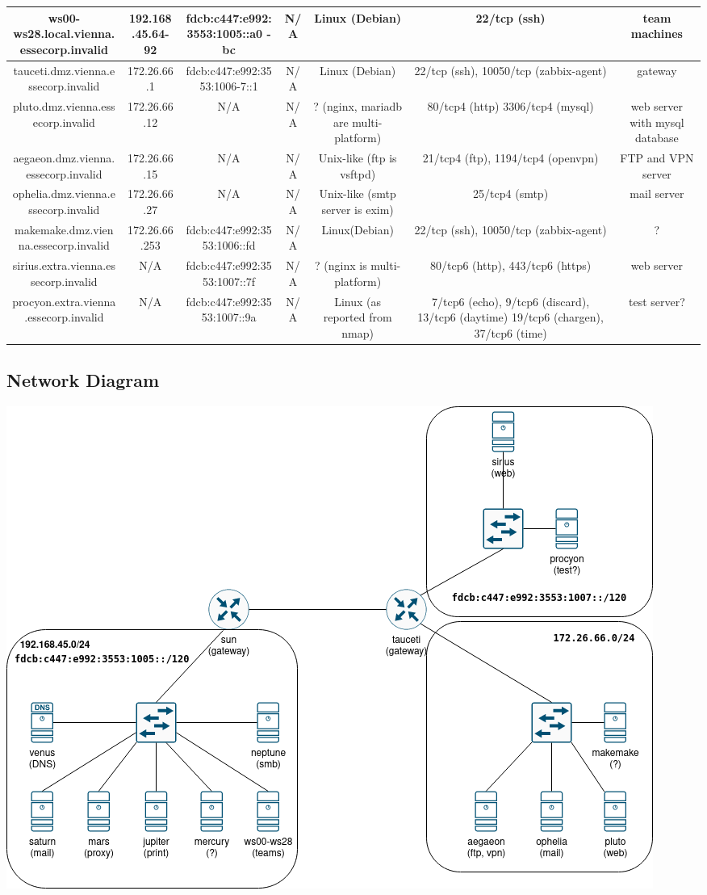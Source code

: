 \begin{center}
{\begin{tabular}{| c | c | c | c | c | c | c |}
        \hline
        ws00-ws28.local.vienna.essecorp.invalid & 192.168.45.64-92 & fdcb:c447:e992:3553:1005::a0 - bc & N/A & Linux (Debian) & 22/tcp (ssh) & team machines \\
        \hline
        tauceti.dmz.vienna.essecorp.invalid     & 172.26.66.1    & fdcb:c447:e992:3553:1006-7::1 & N/A & Linux (Debian) & 22/tcp (ssh), 10050/tcp (zabbix-agent) & gateway \\
        \hline
        pluto.dmz.vienna.essecorp.invalid       & 172.26.66.12   & N/A & N/A & ? (nginx, mariadb are multi-platform) & 80/tcp4 (http) 3306/tcp4 (mysql) & web server with mysql database \\
        \hline
        aegaeon.dmz.vienna.essecorp.invalid     & 172.26.66.15   & N/A & N/A & Unix-like (ftp is vsftpd) & 21/tcp4 (ftp), 1194/tcp4 (openvpn) & FTP and VPN server \\
        \hline
        ophelia.dmz.vienna.essecorp.invalid     & 172.26.66.27   & N/A & N/A & Unix-like (smtp server is exim) & 25/tcp4 (smtp) & mail server \\
        \hline
        makemake.dmz.vienna.essecorp.invalid    & 172.26.66.253  & fdcb:c447:e992:3553:1006::fd & N/A & Linux(Debian) & 22/tcp (ssh), 10050/tcp (zabbix-agent) & ? \\
        \hline
        sirius.extra.vienna.essecorp.invalid    & N/A & fdcb:c447:e992:3553:1007::7f & N/A & ? (nginx is multi-platform) & 80/tcp6 (http), 443/tcp6 (https) & web server \\
        \hline
        procyon.extra.vienna.essecorp.invalid   & N/A & fdcb:c447:e992:3553:1007::9a & N/A & Linux (as reported from nmap) & 7/tcp6 (echo), 9/tcp6 (discard), 13/tcp6 (daytime) 19/tcp6 (chargen), 37/tcp6 (time) & test server? \\
        \hline
    \end{tabular}
    }
\end{center}

\subsection{Network Diagram}
\includegraphics[scale=0.6]{imgs/sse-netscan.png}
